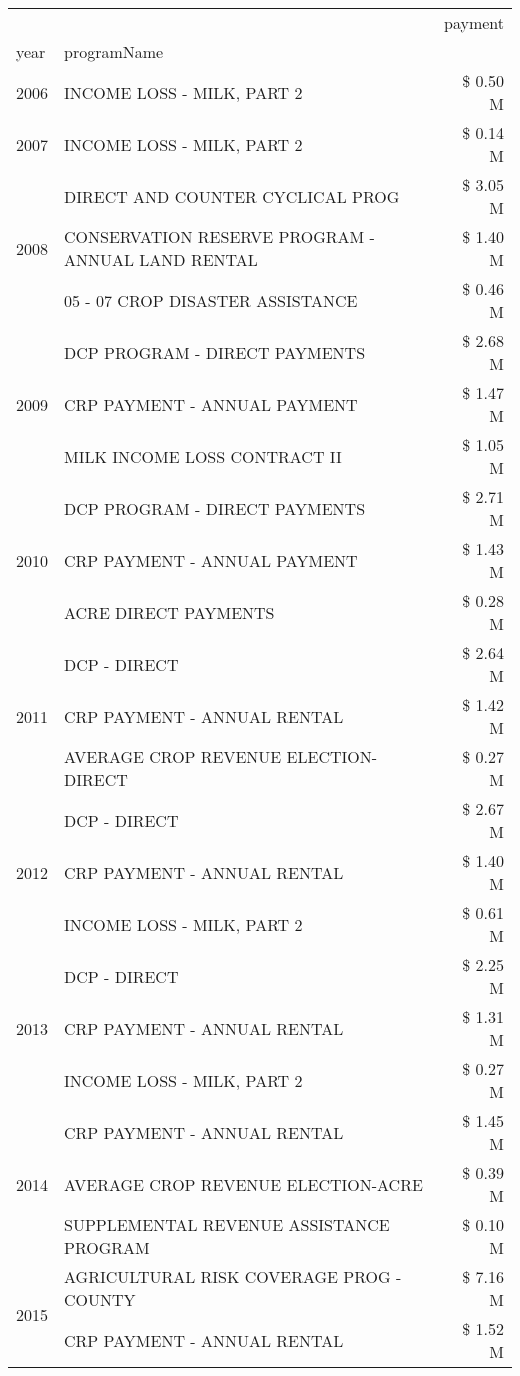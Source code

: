 \begin{tabular}{llr}
\toprule
 &  & payment \\
year & programName &  \\
\midrule
2006 & INCOME LOSS - MILK, PART 2 & \$ 0.50 M \\
\cline{1-3}
2007 & INCOME LOSS - MILK, PART 2 & \$ 0.14 M \\
\cline{1-3}
\multirow[t]{3}{*}{2008} & DIRECT AND COUNTER CYCLICAL PROG & \$ 3.05 M \\
 & CONSERVATION RESERVE PROGRAM - ANNUAL LAND RENTAL & \$ 1.40 M \\
 & 05 - 07 CROP DISASTER ASSISTANCE & \$ 0.46 M \\
\cline{1-3}
\multirow[t]{3}{*}{2009} & DCP PROGRAM - DIRECT PAYMENTS & \$ 2.68 M \\
 & CRP PAYMENT - ANNUAL PAYMENT & \$ 1.47 M \\
 & MILK INCOME LOSS CONTRACT II & \$ 1.05 M \\
\cline{1-3}
\multirow[t]{3}{*}{2010} & DCP PROGRAM - DIRECT PAYMENTS & \$ 2.71 M \\
 & CRP PAYMENT - ANNUAL PAYMENT & \$ 1.43 M \\
 & ACRE DIRECT PAYMENTS & \$ 0.28 M \\
\cline{1-3}
\multirow[t]{3}{*}{2011} & DCP - DIRECT & \$ 2.64 M \\
 & CRP PAYMENT - ANNUAL RENTAL & \$ 1.42 M \\
 & AVERAGE CROP REVENUE ELECTION-DIRECT & \$ 0.27 M \\
\cline{1-3}
\multirow[t]{3}{*}{2012} & DCP - DIRECT & \$ 2.67 M \\
 & CRP PAYMENT - ANNUAL RENTAL & \$ 1.40 M \\
 & INCOME LOSS - MILK, PART 2 & \$ 0.61 M \\
\cline{1-3}
\multirow[t]{3}{*}{2013} & DCP - DIRECT & \$ 2.25 M \\
 & CRP PAYMENT - ANNUAL RENTAL & \$ 1.31 M \\
 & INCOME LOSS - MILK, PART 2 & \$ 0.27 M \\
\cline{1-3}
\multirow[t]{3}{*}{2014} & CRP PAYMENT - ANNUAL RENTAL & \$ 1.45 M \\
 & AVERAGE CROP REVENUE ELECTION-ACRE & \$ 0.39 M \\
 & SUPPLEMENTAL REVENUE ASSISTANCE PROGRAM & \$ 0.10 M \\
\cline{1-3}
\multirow[t]{3}{*}{2015} & AGRICULTURAL RISK COVERAGE PROG - COUNTY & \$ 7.16 M \\
 & CRP PAYMENT - ANNUAL RENTAL & \$ 1.52 M \\

\end{tabular}
